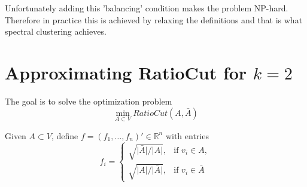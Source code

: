 \documentclass[10pt,a4paper, nocenter]{report}
\begin{document}
	Unfortunately adding this 'balancing' condition makes the problem NP-hard. Therefore in practice this is achieved by relaxing the definitions and that is what spectral clustering achieves. 
	
	\section{Approximating RatioCut for $k=2$}
	The goal is to solve the optimization problem $$ \min_{A\subset V} RatioCut(A,\bar{A})$$
	
	Given $A\subset V$, define $f = (f_{1},\dots,f_{n})' \in \mathbb{R}^{n}$ with entries $$ f_{i} = \begin{cases}
	\sqrt{\lvert \bar{A} \rvert / \lvert A \rvert}, & \text{if }v_{i}\in A,\\
	\sqrt{\lvert A \rvert / \lvert \bar{A} \rvert}, & \text{if }v_{i}\in \bar{A}
	\end{cases}$$
	
\end{document}
